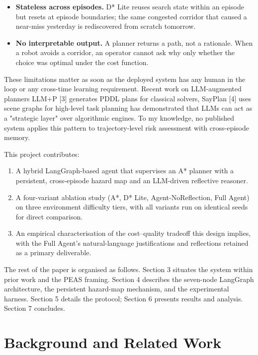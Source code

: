 \documentclass[11pt, letterpaper]{article}
\begin{document}
\begin{itemize}
    \item \textbf{Stateless across episodes.} D* Lite reuses search state within an episode but resets at episode boundaries; the same congested corridor that caused a near-miss yesterday is rediscovered from scratch tomorrow.
    \item \textbf{No interpretable output.} A planner returns a path, not a rationale. When a robot avoids a corridor, an operator cannot ask why only whether the choice was optimal under the cost function.
\end{itemize}

These limitations matter as soon as the deployed system has any human in the loop or any cross-time learning requirement. Recent work on LLM-augmented planners LLM+P [3] generates PDDL plans for classical solvers, SayPlan [4] uses scene graphs for high-level task planning has demonstrated that LLMs can act as a "strategic layer" over algorithmic engines. To my knowledge, no published system applies this pattern to trajectory-level risk assessment with cross-episode memory.

This project contributes:

\begin{enumerate}
    \item A hybrid LangGraph-based agent that supervises an A* planner with a persistent, cross-episode hazard map and an LLM-driven reflective reasoner.
    \item A four-variant ablation study (A*, D* Lite, Agent-NoReflection, Full Agent) on three environment difficulty tiers, with all variants run on identical seeds for direct comparison.
    \item An empirical characterisation of the cost--quality tradeoff this design implies, with the Full Agent's natural-language justifications and reflections retained as a primary deliverable.
\end{enumerate}

The rest of the paper is organised as follows. Section 3 situates the system within prior work and the PEAS framing. Section 4 describes the seven-node LangGraph architecture, the persistent hazard-map mechanism, and the experimental harness. Section 5 details the protocol; Section 6 presents results and analysis. Section 7 concludes.

\section{Background and Related Work}
\end{document}
